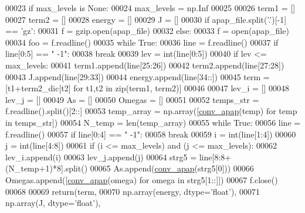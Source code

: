 \begin{DoxyCode}
00023     \textcolor{keywordflow}{if} max\_levels \textcolor{keywordflow}{is} \textcolor{keywordtype}{None}:
00024         max\_levels = np.Inf
00025         
00026     term1 = []
00027     term2 = []
00028     energy = []
00029     J = []
00030     \textcolor{keywordflow}{if} apap\_file.split(\textcolor{stringliteral}{'.'})[-1] == \textcolor{stringliteral}{'gz'}:
00031         f = gzip.open(apap\_file)
00032     \textcolor{keywordflow}{else}:
00033         f = open(apap\_file)
00034     foo = f.readline()
00035     \textcolor{keywordflow}{while} \textcolor{keyword}{True}:
00036         line = f.readline()
00037         \textcolor{keywordflow}{if} line[0:5] == \textcolor{stringliteral}{"   -1"}:
00038             \textcolor{keywordflow}{break}
00039         lev = int(line[0:5])
00040         \textcolor{keywordflow}{if} lev <= max\_levels:
00041             term1.append(line[25:26])
00042             term2.append(line[27:28])
00043             J.append(line[29:33])
00044             energy.append(line[34::])
00045     term = [t1+term2\_dic[t2] \textcolor{keywordflow}{for} t1,t2 \textcolor{keywordflow}{in} zip(term1, term2)]
00046     
00047     lev\_i = []
00048     lev\_j = []
00049     As = []
00050     Omegas = []
00051     
00052     temps\_str = f.readline().split()[2::]
00053     temp\_array = np.array([\hyperlink{namespacepyneb_1_1utils_1_1apap_ad78f65e1ca140daa8a34fd88a91db97a}{conv\_apap}(temp) \textcolor{keywordflow}{for} temp \textcolor{keywordflow}{in} temps\_str])
00054     N\_temp = len(temp\_array)
00055     \textcolor{keywordflow}{while} \textcolor{keyword}{True}:
00056         line = f.readline()
00057         \textcolor{keywordflow}{if} line[0:4] == \textcolor{stringliteral}{"  -1"}:
00058             \textcolor{keywordflow}{break}
00059         i = int(line[1:4])
00060         j = int(line[4:8])
00061         \textcolor{keywordflow}{if} (i <= max\_levels) \textcolor{keywordflow}{and} (j <= max\_levels):
00062             lev\_i.append(i)
00063             lev\_j.append(j)
00064             strg5 = line[8:8+(N\_temp+1)*8].split()
00065             As.append(\hyperlink{namespacepyneb_1_1utils_1_1apap_ad78f65e1ca140daa8a34fd88a91db97a}{conv\_apap}(strg5[0]))
00066             Omegas.append([\hyperlink{namespacepyneb_1_1utils_1_1apap_ad78f65e1ca140daa8a34fd88a91db97a}{conv\_apap}(omega) \textcolor{keywordflow}{for} omega \textcolor{keywordflow}{in} strg5[1::]])
00067     f.close()
00068     
00069     return(term, 
00070            np.array(energy, dtype=\textcolor{stringliteral}{'float'}), 
00071            np.array(J, dtype=\textcolor{stringliteral}{'float'}), 

\end{DoxyCode}
